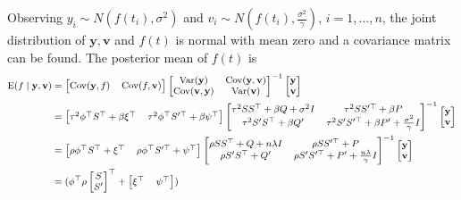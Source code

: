 Observing $y_i\sim N(f (t_i),\sigma^2)$ and $v_i\sim N(f (t_i),\frac{\sigma^2}{\gamma})$, $i=1,\ldots,n$, the joint distribution of $\mathbf{y},\mathbf{v}$ and $f(t)$ is normal with mean zero and a covariance matrix can be found. The posterior mean of $f(t)$ is 
\begin{align}\label{GPrhoeq}\footnotesize
\begin{split}
\E (f \mid  \mathbf{\mathbf{y}},\mathbf{v}) & =
\begin{bmatrix}
\Cov (\mathbf{y},f) & \Cov (f,\mathbf{\mathbf{v}})
\end{bmatrix}\begin{bmatrix}
\Var(\mathbf{y}) & \Cov(\mathbf{y},\mathbf{v})\\
\Cov(\mathbf{v},\mathbf{y}) & \Var(\mathbf{v})
\end{bmatrix}^{-1}\begin{bmatrix}
\mathbf{y}\\\mathbf{v}
\end{bmatrix}\\
&=
\begin{bmatrix}
\tau^2 \phi^\top S^\top+\beta \xi^\top & \tau^2  \phi^\top S'^\top+\beta \psi^\top 
\end{bmatrix}\begin{bmatrix}
\tau^2 SS^\top+\beta Q+\sigma^2 I& \tau^2 SS'^\top+\beta P\\
\tau^2 S'S^\top+\beta Q'& \tau^2 S'S'^\top+\beta P'+\frac{\sigma^2}{\gamma}I
\end{bmatrix}^{-1}\begin{bmatrix}
\mathbf{y}\\\mathbf{v}
\end{bmatrix}\\
&=
\begin{bmatrix}
\rho\phi^\top S^\top+ \xi^\top & \rho\phi^\top S'^\top+\psi^\top
\end{bmatrix}\begin{bmatrix}
\rho SS^\top+Q+n\lambda I& \rho SS'^\top+P\\
\rho S'S^\top+Q'& \rho S'S'^\top+P'+\frac{n\lambda}{\gamma}I
\end{bmatrix}^{-1}\begin{bmatrix}
\mathbf{y}\\\mathbf{v}
\end{bmatrix}\\
&=(\phi^\top \rho 
\begin{bmatrix} S\\ S' \end{bmatrix}^\top + \begin{bmatrix} \xi^\top & \psi^\top\end{bmatrix})

\end{split}
\end{align}
